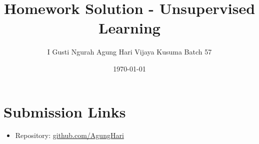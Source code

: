 \documentclass[12pt]{article}
\title{Homework Solution - Unsupervised Learning}
\author{I Gusti Ngurah Agung Hari Vijaya Kusuma Batch 57}
\date{\today}
\begin{document}
\maketitle

\section*{Submission Links}
\begin{itemize}
  \item Repository: \href{https://github.com/AgungHari/Rakamin_HW_MachineLearning_SupervisedLearning}{github.com/AgungHari}
\end{itemize}






\end{document}
